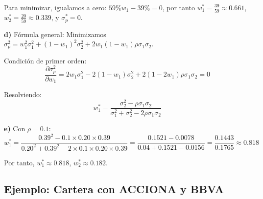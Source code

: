 \begin{ejemplo}
Para minimizar, igualamos a cero: $59\% w_1 - 39\% = 0$, por tanto $w_1^* = \frac{39}{59} \approx 0.661$, $w_2^* = \frac{20}{59} \approx 0.339$, y $\sigma_p^* = 0$.

\textbf{d)} Fórmula general:
Minimizamos $\sigma_p^2 = w_1^2 \sigma_1^2 + (1-w_1)^2 \sigma_2^2 + 2w_1(1-w_1)\rho \sigma_1 \sigma_2$.

Condición de primer orden:
$$\frac{\partial \sigma_p^2}{\partial w_1} = 2w_1 \sigma_1^2 - 2(1-w_1)\sigma_2^2 + 2(1-2w_1)\rho \sigma_1 \sigma_2 = 0$$

Resolviendo:
$$w_1^* = \frac{\sigma_2^2 - \rho \sigma_1 \sigma_2}{\sigma_1^2 + \sigma_2^2 - 2\rho \sigma_1 \sigma_2}$$

\textbf{e)} Con $\rho = 0.1$:
$$w_1^* = \frac{0.39^2 - 0.1 \times 0.20 \times 0.39}{0.20^2 + 0.39^2 - 2 \times 0.1 \times 0.20 \times 0.39} = \frac{0.1521 - 0.0078}{0.04 + 0.1521 - 0.0156} = \frac{0.1443}{0.1765} \approx 0.818$$

Por tanto, $w_1^* \approx 0.818$, $w_2^* \approx 0.182$.
\end{ejemplo}

\subsection{Ejemplo: Cartera con ACCIONA y BBVA}

